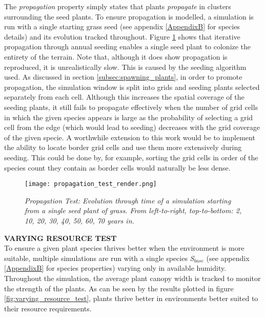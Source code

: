The \textit{propagation} property simply states that plants \textit{propagate} in clusters surrounding the seed plants. To ensure propagation is modelled, a simulation is run with a single starting grass seed (see appendix \ref{AppendixB} for species details) and its evolution tracked throughout. Figure \ref{fig:propagation_test_render} shows that iterative propagation through annual seeding enables a single seed plant to colonize the entirety of the terrain. Note that, although it does show propagation is reproduced, it is unrealistically slow. This is caused by the seeding algorithm used. As discussed in section \ref{subsec:spawning_plants}, in order to promote propagation, the simulation window is split into grids and seeding plants selected separately from each cell. Although this increases the spatial coverage of the seeding plants, it still fails to propagate effectively when the number of grid cells in which the given species appears is large as the probability of selecting a grid cell from the edge (which would lead to seeding) decreases with the grid coverage of the given specie. A worthwhile extension to this work would be to implement the ability to locate border grid cells and use them more extensively during seeding. This could be done by, for example, sorting the grid cells in order of the species count they contain as border cells would naturally be less dense. \\

\begin{figure}
\center
	\texttt{[image: propagation\_test\_render.png]}
	\caption{ \textit{Propagation Test: Evolution through time of a simulation starting from a single seed plant of grass. From left-to-right, top-to-bottom: 2, 10, 20, 30, 40, 50, 60, 70 years in.}}
	\label{fig:propagation_test_render}
\end{figure}

\textbf{VARYING RESOURCE TEST} \\

To ensure a given plant species thrives better when the environment is more suitable, multiple simulations are run with a single species \textit{S$_{base}$} (see appendix \ref{AppendixB} for species properties) varying only in available humidity. Throughout the simulation, the average plant canopy width is tracked to monitor the strength of the plants. As can be seen by the results plotted in figure \ref{fig:varying_resource_test}, plants thrive better in environments better suited to their resource requirements.\\

